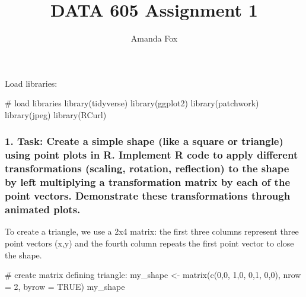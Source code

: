 \documentclass[
  letterpaper,
  DIV=11,
  numbers=noendperiod]{scrartcl}
\title{DATA 605 Assignment 1}
\author{Amanda Fox}
\date{}
\newenvironment{Shaded}{\begin{snugshade}}{\end{snugshade}}
\newcommand{\AttributeTok}[1]{\textcolor[rgb]{0.40,0.45,0.13}{#1}}
\newcommand{\CommentTok}[1]{\textcolor[rgb]{0.37,0.37,0.37}{#1}}
\newcommand{\ConstantTok}[1]{\textcolor[rgb]{0.56,0.35,0.01}{#1}}
\newcommand{\DecValTok}[1]{\textcolor[rgb]{0.68,0.00,0.00}{#1}}
\newcommand{\FunctionTok}[1]{\textcolor[rgb]{0.28,0.35,0.67}{#1}}
\newcommand{\NormalTok}[1]{\textcolor[rgb]{0.00,0.23,0.31}{#1}}
\newcommand{\OtherTok}[1]{\textcolor[rgb]{0.00,0.23,0.31}{#1}}
\begin{document}
\maketitle

Load libraries:

\begin{Shaded}
\begin{Highlighting}[]
\CommentTok{\# load libraries}
\FunctionTok{library}\NormalTok{(tidyverse)}
\FunctionTok{library}\NormalTok{(ggplot2)}
\FunctionTok{library}\NormalTok{(patchwork)}
\FunctionTok{library}\NormalTok{(jpeg)}
\FunctionTok{library}\NormalTok{(RCurl)}
\end{Highlighting}
\end{Shaded}

\subsubsection{1. Task: Create a simple shape (like a square or
triangle) using point plots in R. Implement R code to apply different
transformations (scaling, rotation, reflection) to the shape by left
multiplying a transformation matrix by each of the point vectors.
Demonstrate these transformations through animated
plots.}\label{task-create-a-simple-shape-like-a-square-or-triangle-using-point-plots-in-r.-implement-r-code-to-apply-different-transformations-scaling-rotation-reflection-to-the-shape-by-left-multiplying-a-transformation-matrix-by-each-of-the-point-vectors.-demonstrate-these-transformations-through-animated-plots.}

To create a triangle, we use a 2x4 matrix: the first three columns
represent three point vectors (x,y) and the fourth column repeats the
first point vector to close the shape.

\begin{Shaded}
\begin{Highlighting}[]
\CommentTok{\# create matrix defining triangle:}
\NormalTok{my\_shape }\OtherTok{\textless{}{-}} \FunctionTok{matrix}\NormalTok{(}\FunctionTok{c}\NormalTok{(}\DecValTok{0}\NormalTok{,}\DecValTok{0}\NormalTok{,}
                     \DecValTok{1}\NormalTok{,}\DecValTok{0}\NormalTok{,}
                     \DecValTok{0}\NormalTok{,}\DecValTok{1}\NormalTok{,}
                     \DecValTok{0}\NormalTok{,}\DecValTok{0}\NormalTok{), }
                   \AttributeTok{nrow =} \DecValTok{2}\NormalTok{, }\AttributeTok{byrow =} \ConstantTok{TRUE}\NormalTok{)}
\NormalTok{my\_shape}
\end{Highlighting}
\end{Shaded}
\end{document}
